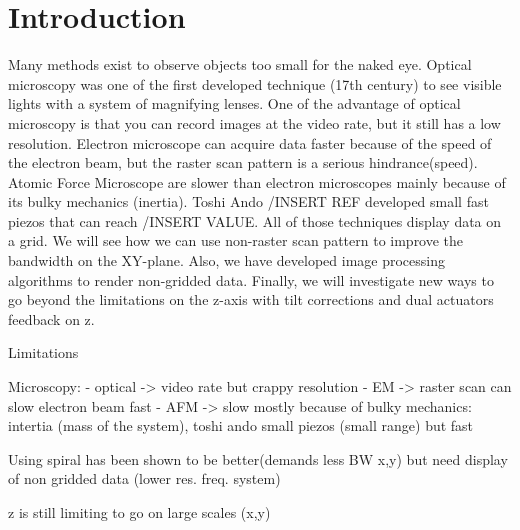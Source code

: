 \chapter{Introduction}

Many methods exist to observe objects too small for the naked eye. Optical microscopy was one of the first developed technique (17th century) to see visible lights with a system of magnifying lenses. One of the advantage of optical microscopy is that you can record images at the video rate, but it still has a low resolution.
Electron microscope can acquire data faster because of the speed of the electron beam, but the raster scan pattern is a serious hindrance(speed). Atomic Force Microscope are slower than electron microscopes mainly because of its bulky mechanics (inertia). Toshi Ando /INSERT REF developed small fast piezos that can reach /INSERT VALUE. All of those techniques display data on a grid. We will see how we can use non-raster scan pattern to improve the bandwidth on the XY-plane. Also, we have developed image processing algorithms to render non-gridded data. Finally, we will investigate new ways to go beyond the limitations on the z-axis with tilt corrections and dual actuators feedback on z.



Limitations

Microscopy:
	- optical -> video rate but crappy resolution
	- EM -> raster scan can slow electron beam fast
	- AFM -> slow mostly because of bulky mechanics: intertia (mass of the system), toshi ando small piezos (small range) but fast

Using spiral has been shown to be better(demands less BW x,y) but need display of non gridded data (lower res. freq. system)

z is still limiting to go on large scales (x,y)



